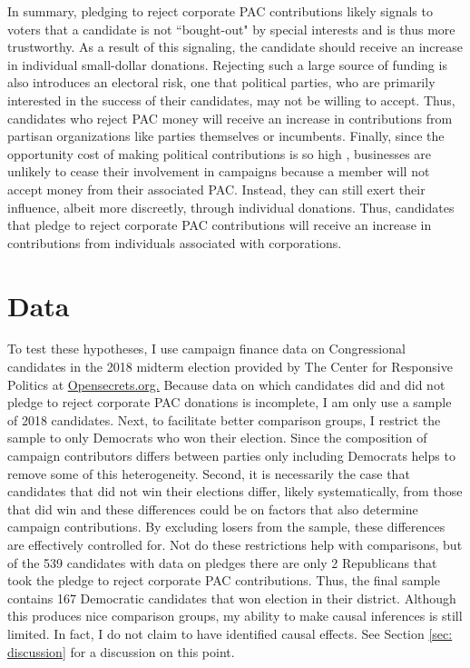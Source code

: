 \documentclass[12pt]{article}
\begin{document}
 In summary, pledging to reject corporate PAC contributions likely signals to voters that a candidate is not ``bought-out" by special interests and is thus more trustworthy. As a result of this signaling, the candidate should receive an increase in individual small-dollar donations. Rejecting such a large source of funding is also introduces an electoral risk, one that political parties, who are primarily interested in the success of their candidates, may not be willing to accept. Thus, candidates who reject PAC money will receive an increase in contributions from partisan organizations like parties themselves or incumbents. Finally, since the opportunity cost of making political contributions is so high \citep{grier_committee_1991}, businesses are unlikely to cease their involvement in campaigns because a member will not accept money from their associated PAC. Instead, they can still exert their influence, albeit more discreetly, through individual donations. Thus, candidates that pledge to reject corporate PAC contributions will receive an increase in contributions from individuals associated with corporations.


\section{Data}

To test these hypotheses, I use campaign finance data on Congressional candidates in the 2018 midterm election provided by The Center for Responsive Politics at \href{https://www.opensecrets.org}{Opensecrets.org.} Because data on which candidates did and did not pledge to reject corporate PAC donations is incomplete, I am only use a sample of 2018 candidates. Next, to facilitate better comparison groups, I restrict the sample to only Democrats who won their election. Since the composition of campaign contributors differs between parties only including Democrats helps to remove some of this heterogeneity. Second, it is necessarily the case that candidates that did not win their elections differ, likely systematically, from those that did win and these differences could be on factors that also determine campaign contributions. By excluding losers from the sample, these differences are effectively controlled for. Not do these restrictions help with comparisons, but of the 539 candidates with data on pledges there are only 2 Republicans that took the pledge to reject corporate PAC contributions. Thus, the final sample contains 167 Democratic candidates that won election in their district. Although this produces nice comparison groups, my ability to make causal inferences is still limited. In fact, I do not claim to have identified causal effects. See Section \ref{sec: discussion} for a discussion on this point. 
\end{document}
